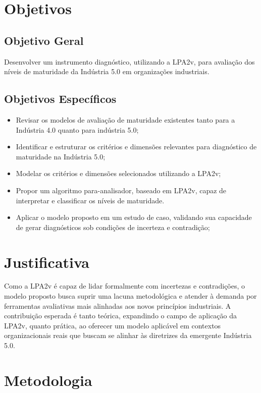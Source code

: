 \section{Objetivos}

\subsection{Objetivo Geral}

Desenvolver um instrumento diagnóstico, utilizando a \gls{LPA2v}, para avaliação dos níveis de maturidade da Indústria 5.0 em organizações industriais.

\subsection{Objetivos Específicos}

\begin{itemize}
  \item Revisar os modelos de avaliação de maturidade existentes tanto para a Indústria 4.0 quanto para indústria 5.0;
  \item Identificar e estruturar os critérios e dimensões relevantes para diagnóstico de maturidade na Indústria 5.0;
  \item Modelar os critérios e dimensões selecionados utilizando a \gls{LPA2v};
  \item Propor um algoritmo para-analisador, baseado em \gls{LPA2v}, capaz de interpretar e classificar os níveis de maturidade.
  \item Aplicar o modelo proposto em um estudo de caso, validando sua capacidade de gerar diagnósticos sob condições de incerteza e contradição;
\end{itemize}

\section{Justificativa}

Como a \gls{LPA2v} é capaz  de lidar formalmente com incertezas e contradições, o modelo proposto busca suprir uma lacuna metodológica e atender à demanda por ferramentas avaliativas mais alinhadas aos novos princípios industriais. A contribuição esperada é tanto teórica, expandindo o campo de aplicação da \gls{LPA2v}, quanto prática, ao oferecer um modelo aplicável em contextos organizacionais reais que buscam se alinhar às diretrizes da emergente Indústria 5.0.

\section{Metodologia}

